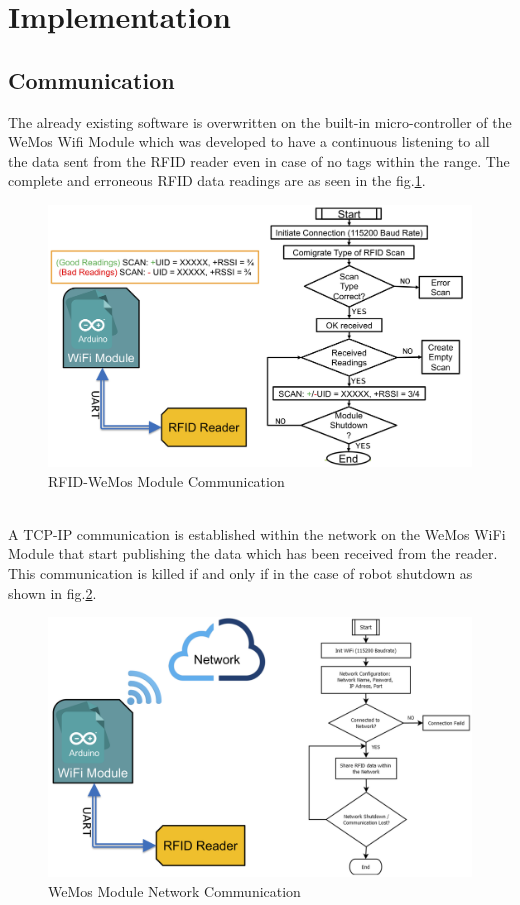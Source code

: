 \section{Implementation}\label{Sec_Imp}

\subsection{Communication}
The already existing software is overwritten on the  built-in micro-controller of the WeMos Wifi Module which was developed to have a continuous listening to all the data  sent from the RFID reader even in case of no tags within the range. The complete and erroneous RFID data readings are as seen in the fig.\ref{rfid_wifi}.\\
\begin{figure}[!htbp]
	\centering
	\includegraphics[width = 14cm]{Pictures/rfidwifi}
	\caption{RFID-WeMos Module Communication}
	\label{rfid_wifi}
\end{figure}\\
A TCP-IP communication is established within the network on the WeMos WiFi Module that start publishing the data which has been received from the reader. This communication is killed if and only if in the case of robot shutdown as shown in fig.\ref{wifi_network}.\\
\begin{figure}[!htbp]
	\centering
	\includegraphics[width = 14cm]{Pictures/wifinetwork}
	\caption{WeMos Module Network Communication}
	\label{wifi_network}
\end{figure}
